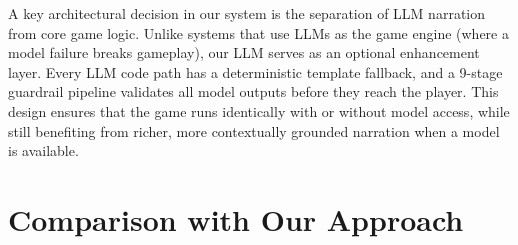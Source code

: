 \documentclass[12pt, a4paper, oneside]{report}
\begin{document}
A key architectural decision in our system is the separation of LLM narration from core game logic. Unlike systems that use LLMs as the game engine (where a model failure breaks gameplay), our LLM serves as an optional enhancement layer. Every LLM code path has a deterministic template fallback, and a 9-stage guardrail pipeline validates all model outputs before they reach the player. This design ensures that the game runs identically with or without model access, while still benefiting from richer, more contextually grounded narration when a model is available.

\section{Comparison with Our Approach}
\label{sec:lit-comparison}
\end{document}
